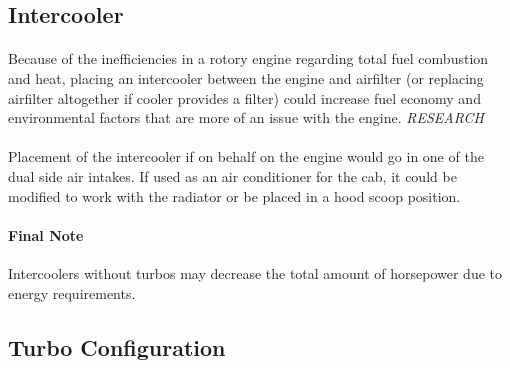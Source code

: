 \documentclass[a4paper,10pt]{report}
\begin{document}
\subsection{Intercooler} 
\paragraph*{}Because of the inefficiencies in a rotory engine regarding total fuel combustion and heat, placing an intercooler between the engine and airfilter (or replacing airfilter altogether if cooler provides a filter) could increase fuel economy and environmental factors that are more of an issue with the engine. \textit{RESEARCH}
\paragraph*{}Placement of the intercooler if on behalf on the engine would go in one of the dual side air intakes. If used as an air conditioner for the cab, it could be modified to work with the radiator or be placed in a hood scoop position.
\paragraph*{Final Note} Intercoolers without turbos may decrease the total amount of horsepower due to energy requirements.
\subsection{Turbo Configuration} 
\end{document}
